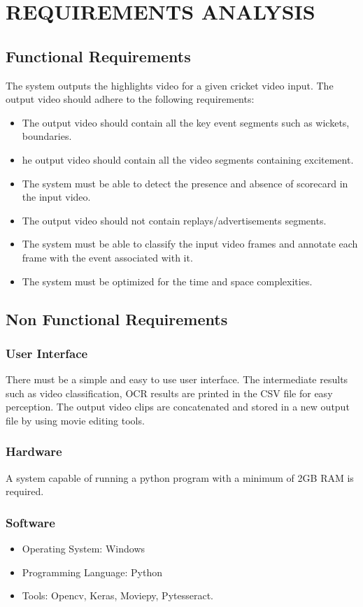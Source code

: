
\chapter{REQUIREMENTS ANALYSIS} %

\section{Functional Requirements}
The system outputs the highlights video for a given cricket video input. The output video should adhere to the following requirements:
\begin{itemize}
\item The output video should contain all the key event segments such as wickets, boundaries.
\item he output video should contain all the video segments containing excitement.
\item The system must be able to detect the presence and absence of scorecard in the input video.
\item The output video should not contain replays/advertisements segments.
\item The system must be able to classify the input video frames and annotate each frame with the event associated with it.
\item The system must be optimized for the time and space complexities.
\end{itemize}

\section{Non Functional Requirements}
\subsection{User Interface}
There must be a simple and easy to use user interface.
The intermediate results such as video classification, OCR results are printed in the CSV file for easy perception.
The output video clips are concatenated and stored in a new output file by using movie editing tools.
\subsection{Hardware}
A system capable of running a python program with a minimum of 2GB RAM is required.
\subsection{Software}
\begin{itemize}
\item Operating System: Windows
\item Programming Language: Python
\item Tools: Opencv, Keras, Moviepy, Pytesseract.
\end{itemize}

